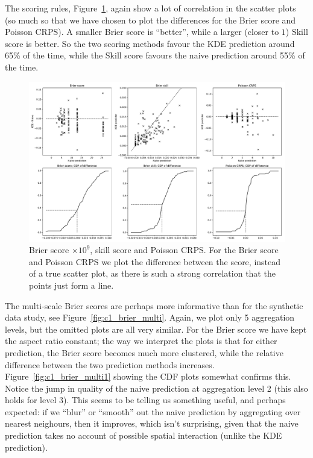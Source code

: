 \documentclass[twoside,a4paper,twocolumn,10pt]{article}
\theoremstyle{plain}
\theoremstyle{definition}
\begin{document}
The scoring rules, Figure~\ref{fig:c1_brier}, again show a lot of correlation
in the scatter plots (so much so that we have chosen to plot the differences
for the Brier score and Poisson CRPS).  A smaller Brier score is ``better'', while
a larger (closer to $1$) Skill score is better.  So the two scoring methods
favour the KDE prediction around 65\% of the time, while the Skill score favours
the naive prediction around 55\% of the time.

\begin{figure}
	\includegraphics[width=\textwidth]{../details/northside_brier.pdf}
  \caption{Brier score $\times 10^9$, skill score and Poisson CRPS.
  For the Brier score and Poisson CRPS we plot the difference between the score,
  instead of a true scatter plot, as there is such a strong correlation that the points
  just form a line.}
   \label{fig:c1_brier}
\end{figure}

The multi-scale Brier scores are perhaps more informative than for the synthetic
data study, see Figure~\ref{fig:c1_brier_multi}.  Again, we plot only 5 aggregation
levels, but the omitted plots are all very similar.
For the Brier score we have kept
the aspect ratio constant; the way we interpret the plots is that for either prediction,
the Brier score becomes much more clustered, while the relative difference between the
two prediction methods increases.  Figure~\ref{fig:c1_brier_multi1} showing the CDF plots
somewhat confirms this.  Notice the jump in quality of the naive prediction at aggregation
level 2 (this also holds for level 3).  This seems to be telling us something useful, and
perhaps expected: if we ``blur'' or ``smooth'' out the naive prediction by aggregating
over nearest neighours, then it improves, which isn't surprising, given that the naive
prediction takes no account of possible spatial interaction (unlike the KDE prediction).
\end{document}
